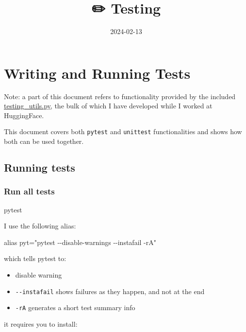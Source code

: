 \documentclass[
]{report}
\title{✏️ Testing}
\author{}
\date{2024-02-13}
\newenvironment{Shaded}{\begin{snugshade}}{\end{snugshade}}
\newcommand{\BuiltInTok}[1]{\textcolor[rgb]{0.00,0.23,0.31}{#1}}
\newcommand{\NormalTok}[1]{\textcolor[rgb]{0.00,0.23,0.31}{#1}}
\newcommand{\StringTok}[1]{\textcolor[rgb]{0.13,0.47,0.30}{#1}}
\providecommand{\tightlist}{%
  \setlength{\itemsep}{0pt}\setlength{\parskip}{0pt}}\usepackage{longtable,booktabs,array}
\begin{document}
\maketitle

\chapter{Writing and Running Tests}\label{writing-and-running-tests}

Note: a part of this document refers to functionality provided by the
included \url{testing_utils.py}, the bulk of which I have developed
while I worked at HuggingFace.

This document covers both \texttt{pytest} and \texttt{unittest}
functionalities and shows how both can be used together.

\section{Running tests}\label{running-tests}

\subsection{Run all tests}\label{run-all-tests}

\begin{Shaded}
\begin{Highlighting}[]
\NormalTok{pytest}
\end{Highlighting}
\end{Shaded}

I use the following alias:

\begin{Shaded}
\begin{Highlighting}[]
\BuiltInTok{alias}\NormalTok{ pyt=}\StringTok{"pytest {-}{-}disable{-}warnings {-}{-}instafail {-}rA"}
\end{Highlighting}
\end{Shaded}

which tells pytest to:

\begin{itemize}
\tightlist
\item
  disable warning
\item
  \texttt{-\/-instafail} shows failures as they happen, and not at the
  end
\item
  \texttt{-rA} generates a short test summary info
\end{itemize}

it requires you to install:
\end{document}
